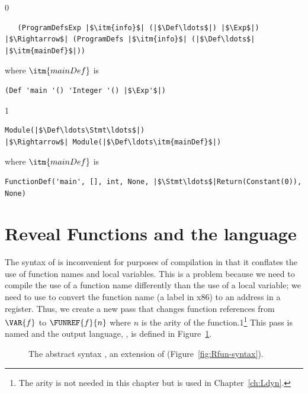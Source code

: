 \documentclass[7x10,nocrop]{TimesAPriori_MIT}%
\newcommand{\gray}[1]{{\color{gray} #1}}
\def\racketEd{0}
\def\pythonEd{1}
\def\edition{0}
\newcommand{\python}[1]{{\if\edition\pythonEd #1\fi}}
\begin{document}
{\if\edition\racketEd  
\begin{lstlisting}
   (ProgramDefsExp |$\itm{info}$| (|$\Def\ldots$|) |$\Exp$|)
|$\Rightarrow$| (ProgramDefs |$\itm{info}$| (|$\Def\ldots$| |$\itm{mainDef}$|))
\end{lstlisting}
where $\itm{mainDef}$ is
\begin{lstlisting}
(Def 'main '() 'Integer '() |$\Exp'$|)
\end{lstlisting}
\fi}
{\if\edition\pythonEd
\begin{lstlisting}
Module(|$\Def\ldots\Stmt\ldots$|)
|$\Rightarrow$| Module(|$\Def\ldots\itm{mainDef}$|)
\end{lstlisting}
where $\itm{mainDef}$ is
\begin{lstlisting}
FunctionDef('main', [], int, None, |$\Stmt\ldots$|Return(Constant(0)), None)
\end{lstlisting}
\fi}

\section{Reveal Functions and the \LangFunRef{} language}
\label{sec:reveal-functions-r4}

The syntax of \LangFun{} is inconvenient for purposes of compilation
in that it conflates the use of function names and local
variables. This is a problem because we need to compile the use of a
function name differently than the use of a local variable; we need to
use  to convert the function name (a label in x86) to an
address in a register.  Thus, we create a new pass that changes
function references from $\VAR{f}$ to $\FUNREF{f}{n}$ where $n$ is the
arity of the function.\python{\footnote{The arity is not needed in this
    chapter but is used in Chapter~\ref{ch:Ldyn}.}}  This pass is
named  and the output language, \LangFunRef{},
is defined in Figure~\ref{fig:f1-syntax}.

\begin{figure}[tp]
\centering
\fbox{
\begin{minipage}{0.96\textwidth}
{\if\edition\racketEd   
\[
\begin{array}{lcl}
\Exp &::=& \ldots \MID \FUNREF{\Var}{\Int}\\
 \Def &::=& \gray{ \FUNDEF{\Var}{([\Var \code{:} \Type]\ldots)}{\Type}{\code{'()}}{\Exp} }\\
  \LangFunRefM{} &::=& \PROGRAMDEFS{\code{'()}}{\LP \Def\ldots \RP}
\end{array}
\]
\fi}
{\if\edition\pythonEd  
\[
\begin{array}{lcl}
\Exp &::=& \FUNREF{\Var}{\Int}\\
  \LangFunRefM{} &::=& \PROGRAM{}{\LS \Def \code{,} \ldots \RS}
\end{array}
\]
\fi}
\end{minipage}
}
\caption{The abstract syntax \LangFunRef{}, an extension of \LangFun{}
  (Figure~\ref{fig:Rfun-syntax}).}
\label{fig:f1-syntax}
\end{figure}
\end{document}
